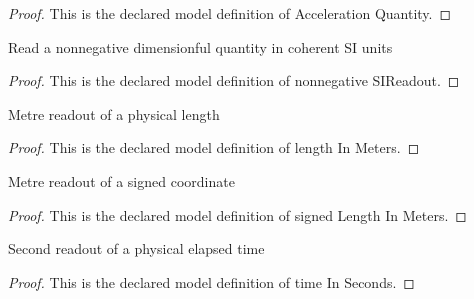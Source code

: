 \begin{proof}
  This is the declared model definition of Acceleration Quantity.
\end{proof}
\begin{definition}
  \label{def:physics:phyx-mini-0743:phyxminiproblems-problemphyxmini0743-nonnegativesireadout}
  Read a nonnegative dimensionful quantity in coherent SI units
\end{definition}
\begin{proof}
  This is the declared model definition of nonnegative SIReadout.
\end{proof}
\begin{definition}
  \label{def:physics:phyx-mini-0743:phyxminiproblems-problemphyxmini0743-lengthinmeters}
  Metre readout of a physical length
\end{definition}
\begin{proof}
  This is the declared model definition of length In Meters.
\end{proof}
\begin{definition}
  \label{def:physics:phyx-mini-0743:phyxminiproblems-problemphyxmini0743-signedlengthinmeters}
  Metre readout of a signed coordinate
\end{definition}
\begin{proof}
  This is the declared model definition of signed Length In Meters.
\end{proof}
\begin{definition}
  \label{def:physics:phyx-mini-0743:phyxminiproblems-problemphyxmini0743-timeinseconds}
  Second readout of a physical elapsed time
\end{definition}
\begin{proof}
  This is the declared model definition of time In Seconds.
\end{proof}
